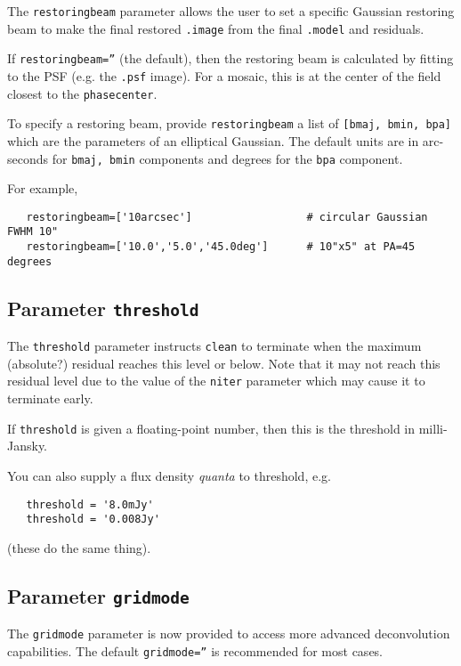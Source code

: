 The {\tt restoringbeam} parameter allows the user to set a specific
Gaussian restoring beam to make the final restored {\tt .image} from
the final {\tt .model} and residuals.

If {\tt restoringbeam=''} (the default), then the restoring beam
is calculated by fitting to the PSF (e.g. the {\tt .psf} image).
For a mosaic, this is at the center of the field closest to the
{\tt phasecenter}.

To specify a restoring beam, provide {\tt restoringbeam} a list of 
{\tt [bmaj, bmin, bpa]} which are the parameters of an elliptical
Gaussian.  The default units are in arc-seconds for {\tt bmaj, bmin}
components and degrees for the {\tt bpa} component.

For example,
\small
\begin{verbatim}
   restoringbeam=['10arcsec']                  # circular Gaussian FWHM 10"
   restoringbeam=['10.0','5.0','45.0deg']      # 10"x5" at PA=45 degrees
\end{verbatim}
\normalsize

\subsection{Parameter {\tt threshold} }
\label{section:im.clean.thresh}

The {\tt threshold} parameter instructs {\tt clean} to terminate when
the maximum (absolute?) residual reaches this level or below.  Note
that it may not reach this residual level due to the value of the
{\tt niter} parameter which may cause it to terminate early.

If {\tt threshold} is given a floating-point number, then this is the
threshold in milli-Jansky.

You can also supply a flux density {\em quanta} to threshold, e.g.
\small
\begin{verbatim}
   threshold = '8.0mJy'
   threshold = '0.008Jy'
\end{verbatim}
\normalsize
(these do the same thing).

\subsection{Parameter {\tt gridmode} }
\label{section:im.clean.gridmode}

The {\tt gridmode} parameter is now provided to access more
advanced deconvolution capabilities.  The default 
{\tt gridmode=''} is recommended for most cases.

